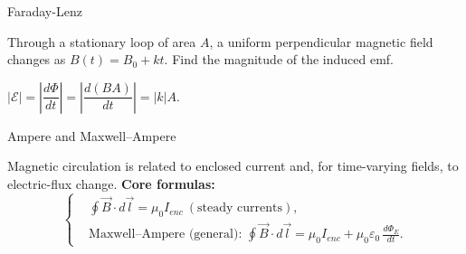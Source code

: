 \begin{KnowledgePoint}{Faraday-Lenz \Core}
  \KPProblems
  \begin{cheatproblem}
  Through a stationary loop of area $A$, a uniform perpendicular magnetic field changes as $B(t)=B_0+kt$. Find the magnitude of the induced emf.
  \begin{solutionbox}
  $|\mathcal E|=\left|\dfrac{d\Phi}{dt}\right|=\left|\dfrac{d(BA)}{dt}\right|=|k|A$.
  \end{solutionbox}
  \end{cheatproblem}
\end{KnowledgePoint}

\begin{KnowledgePoint}{Ampere and Maxwell--Ampere \Extension}
  \KPFormulas
  \begin{formulabox}
  Magnetic circulation is related to enclosed current and, for time-varying fields, to electric-flux change.
  \textbf{Core formulas:}
  \[
  \left\{\begin{aligned}
    &\oint \vec B\cdot d\vec l=\mu_0 I_{enc}\ (\text{steady currents}),\\
    &\text{Maxwell--Ampere (general): }\oint \vec B\cdot d\vec l=\mu_0 I_{enc}+\mu_0\varepsilon_0\,\frac{d\Phi_E}{dt}.
  \end{aligned}\right.
  \]
  \end{formulabox}
\end{KnowledgePoint}

